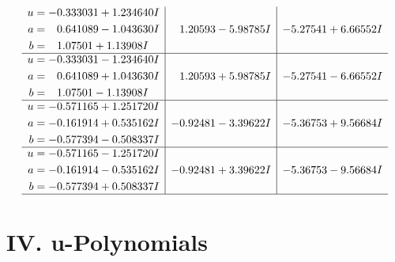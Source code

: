 \documentclass[1p]{elsarticle_modified}
\theoremstyle{definition}
\begin{document}
$$\begin{array}{c|c|c}
\begin{aligned}
u &= -0.333031 + 1.234640 I \\
a &= \phantom{-}0.641089 - 1.043630 I \\
b &= \phantom{-}1.07501 + 1.13908 I\end{aligned}
 & \phantom{-}1.20593 - 5.98785 I & -5.27541 + 6.66552 I \\ \hline\begin{aligned}
u &= -0.333031 - 1.234640 I \\
a &= \phantom{-}0.641089 + 1.043630 I \\
b &= \phantom{-}1.07501 - 1.13908 I\end{aligned}
 & \phantom{-}1.20593 + 5.98785 I & -5.27541 - 6.66552 I \\ \hline\begin{aligned}
u &= -0.571165 + 1.251720 I \\
a &= -0.161914 + 0.535162 I \\
b &= -0.577394 - 0.508337 I\end{aligned}
 & -0.92481 - 3.39622 I & -5.36753 + 9.56684 I \\ \hline\begin{aligned}
u &= -0.571165 - 1.251720 I \\
a &= -0.161914 - 0.535162 I \\
b &= -0.577394 + 0.508337 I\end{aligned}
 & -0.92481 + 3.39622 I & -5.36753 - 9.56684 I\\
 \hline 
 \end{array}$$\newpage
\newpage\renewcommand{\arraystretch}{1}
\centering \section*{ IV. u-Polynomials}
\end{document}
